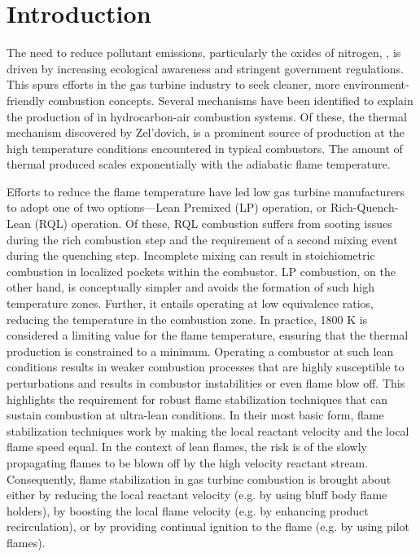 \chapter{Introduction}
\label{ch:introduction}



The need to reduce pollutant emissions, particularly the oxides of nitrogen, , is driven by increasing ecological awareness and stringent government regulations.
This spurs efforts in the gas turbine industry to seek cleaner, more environment-friendly combustion concepts.
Several mechanisms have been identified to explain the production of  in hydrocarbon-air combustion systems.
Of these, the thermal  mechanism discovered by Zel'dovich, is a prominent source of  production at the high temperature conditions encountered in typical combustors.
The amount of thermal  produced scales exponentially with the adiabatic flame temperature.

Efforts to reduce the flame temperature have led low  gas turbine manufacturers to adopt one of two options---Lean Premixed (LP) operation, or Rich-Quench-Lean (RQL) operation.
Of these, RQL combustion suffers from sooting issues during the rich combustion step and the requirement of a second mixing event during the quenching step.
Incomplete mixing can result in stoichiometric combustion in localized pockets within the combustor.
LP combustion, on the other hand, is conceptually simpler and avoids the formation of such high temperature zones.
Further, it entails operating at low equivalence ratios, reducing the temperature in the combustion zone.
In practice, 1800 K is considered a limiting value for the flame temperature, ensuring that the thermal  production is constrained to a minimum.
Operating a combustor at such lean conditions results in weaker combustion processes that are highly susceptible to perturbations and results in combustor instabilities or even flame blow off.
This highlights the requirement for robust flame stabilization techniques that can sustain combustion at ultra-lean conditions.
In their most basic form, flame stabilization techniques work by making the local reactant velocity and the local flame speed equal.
In the context of lean flames, the risk is of the slowly propagating flames to be blown off by the high velocity reactant stream.
Consequently, flame stabilization in gas turbine combustion is brought about either by reducing the local reactant velocity (e.g. by using bluff body flame holders), by boosting the local flame velocity (e.g. by enhancing product recirculation), or by providing continual ignition to the flame (e.g. by using pilot flames).

